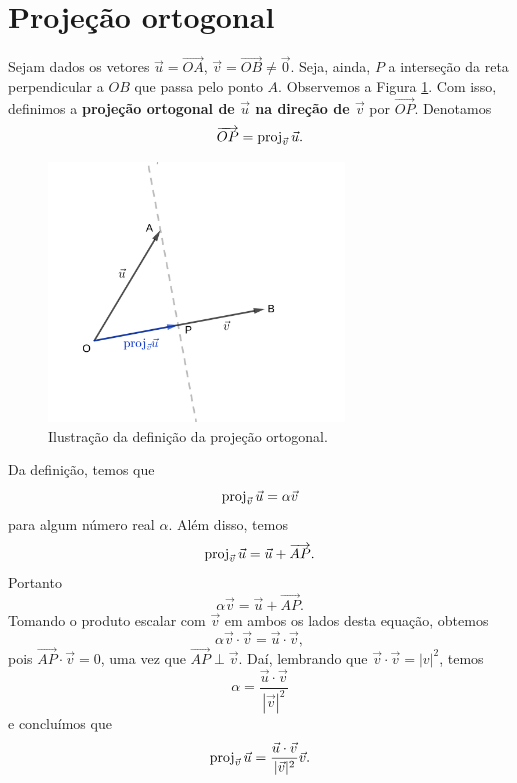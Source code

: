 \emconstrucao

\section{Projeção ortogonal}\label{cap_prodesc_sec_proj}

Sejam dados os vetores $\vec{u}=\overrightarrow{OA}$, $\vec{v}=\overrightarrow{OB}\neq\vec{0}$. Seja, ainda, $P$ a interseção da reta perpendicular a $OB$ que passa pelo ponto $A$. Observemos a Figura \ref{fig:proj}. Com isso, definimos a {\bf projeção ortogonal de $\vec{u}$ na direção de $\vec{v}$}  por $\overrightarrow{OP}$. Denotamos
\begin{equation}
  \overrightarrow{OP} = \operatorname{proj}_{\vec{v}}\vec{u}.
\end{equation}

\begin{figure}[H]
  \centering
  \includegraphics[width=0.7\textwidth]{./cap_prodesc/dados/fig_proj/fig_proj}
  \caption{Ilustração da definição da projeção ortogonal.}
  \label{fig:proj}
\end{figure}

Da definição, temos que
\begin{equation}
  \operatorname{proj}_{\vec{v}}\vec{u} = \alpha\vec{v}
\end{equation}
para algum número real $\alpha$. Além disso, temos
\begin{equation}
  \operatorname{proj}_{\vec{v}}\vec{u} = \vec{u} + \overrightarrow{AP}.
\end{equation}
Portanto
\begin{equation}
  \alpha\vec{v} = \vec{u} + \overrightarrow{AP}.
\end{equation}
Tomando o produto escalar com $\vec{v}$ em ambos os lados desta equação, obtemos
\begin{equation}
  \alpha\vec{v}\cdot\vec{v} = \vec{u}\cdot\vec{v},
\end{equation}
pois $\overrightarrow{AP}\cdot\vec{v}=0$, uma vez que $\overrightarrow{AP}\perp\vec{v}$. Daí, lembrando que $\vec{v}\cdot\vec{v}=|v|^2$, temos
\begin{equation}
  \alpha = \frac{\vec{u}\cdot\vec{v}}{|\vec{v}|^2}
\end{equation}
e concluímos que
\begin{equation}\label{eq:proj}
  \operatorname{proj}_{\vec{v}}\vec{u} = \frac{\vec{u}\cdot\vec{v}}{|\vec{v}|^2}\vec{v}.
\end{equation}

